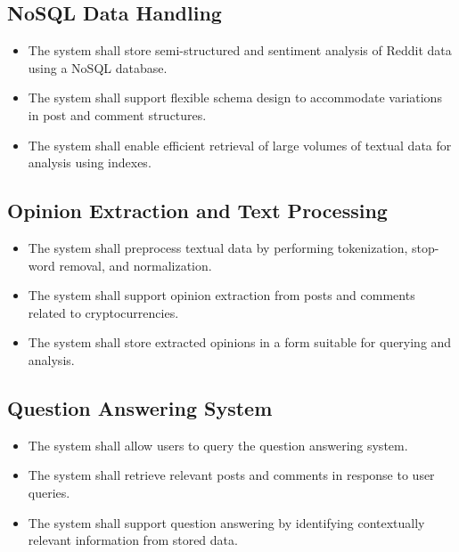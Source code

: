 \subsection{NoSQL Data Handling}

\begin{itemize}
    \item The system shall store semi-structured and sentiment analysis of Reddit data using a NoSQL database.
    \item The system shall support flexible schema design to accommodate variations in post and comment structures.
    \item The system shall enable efficient retrieval of large volumes of textual data for analysis using indexes.
\end{itemize}

\subsection{Opinion Extraction and Text Processing}

\begin{itemize}
    \item The system shall preprocess textual data by performing tokenization, stop-word removal, and normalization.
    \item The system shall support opinion extraction from posts and comments related to cryptocurrencies.
    \item The system shall store extracted opinions in a form suitable for querying and analysis.
\end{itemize}

\subsection{Question Answering System}

\begin{itemize}
    \item The system shall allow users to query the question answering system.
    \item The system shall retrieve relevant posts and comments in response to user queries.
    \item The system shall support question answering by identifying contextually relevant information from stored data.
\end{itemize}

